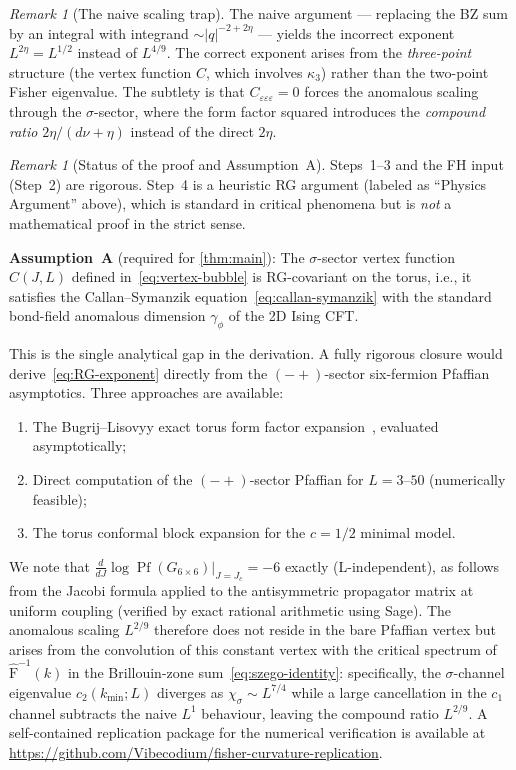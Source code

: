 \documentclass[11pt]{article}
\theoremstyle{definition}
\theoremstyle{remark}
\newtheorem{remark}[theorem]{Remark}
\begin{document}
\begin{remark}[The naive scaling trap]
\label{rem:naive-trap}
The naive argument --- replacing the BZ sum by an integral
with integrand $\sim |q|^{-2+2\eta}$ --- yields the incorrect
exponent $L^{2\eta} = L^{1/2}$ instead of $L^{4/9}$.
The correct exponent arises from the \emph{three-point} structure
(the vertex function $C$, which involves $\kappa_3$) rather than
the two-point Fisher eigenvalue. The subtlety is that
$C_{\varepsilon\varepsilon\varepsilon} = 0$ forces the anomalous
scaling through the $\sigma$-sector, where the form factor
squared introduces the \emph{compound ratio}
$2\eta/(d\nu + \eta)$ instead of the direct $2\eta$.
\end{remark}

\begin{remark}[Status of the proof and Assumption~A]
\label{rem:proof-status}
Steps~1--3 and the FH input (Step~2) are rigorous.
Step~4 is a heuristic RG argument (labeled as ``Physics Argument''
above), which is standard in critical phenomena but is \emph{not}
a mathematical proof in the strict sense.

\textbf{Assumption~A} (required for \cref{thm:main}):
The $\sigma$-sector vertex function $C(J,L)$ defined
in~\eqref{eq:vertex-bubble} is RG-covariant on the torus, i.e.,
it satisfies the Callan--Symanzik equation~\eqref{eq:callan-symanzik}
with the standard bond-field anomalous dimension $\gamma_\phi$
of the 2D Ising CFT.

This is the single analytical gap in the derivation.
A fully rigorous closure would derive~\eqref{eq:RG-exponent}
directly from the $(-+)$-sector six-fermion Pfaffian asymptotics.
Three approaches are available:
\begin{enumerate}
  \item The Bugrij--Lisovyy exact torus form factor
    expansion~\cite{BugrijLisovyy2001,IorgovLisovyy2011},
    evaluated asymptotically;
  \item Direct computation of the $(-+)$-sector Pfaffian
    for $L = 3$--$50$ (numerically feasible);
  \item The torus conformal block expansion for the
    $c = 1/2$ minimal model.
\end{enumerate}

We note that $\tfrac{d}{dJ}\log\operatorname{Pf}(G_{6\times 6})\big|_{J=J_c} = -6$
exactly (L-independent), as follows from the Jacobi formula applied to the
antisymmetric propagator matrix at uniform coupling (verified by exact rational
arithmetic using Sage).  The anomalous scaling $L^{2/9}$ therefore does not
reside in the bare Pfaffian vertex but arises from the convolution of this
constant vertex with the critical spectrum of $\hat{\mathrm{F}}^{-1}(k)$ in
the Brillouin-zone sum~\eqref{eq:szego-identity}: specifically, the $\sigma$-channel
eigenvalue $c_2(k_{\min};L)$ diverges as $\chi_\sigma \sim L^{7/4}$ while a
large cancellation in the $c_1$ channel subtracts the naive $L^1$ behaviour,
leaving the compound ratio $L^{2/9}$.  A self-contained replication package
for the numerical verification is available at
\url{https://github.com/Vibecodium/fisher-curvature-replication}.
\end{remark}
\end{document}
